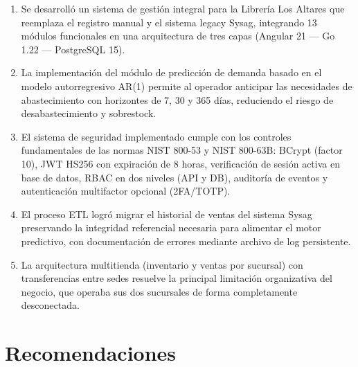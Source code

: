 \documentclass[12pt,a4paper,oneside]{report}
\begin{document}
\begin{enumerate}[leftmargin=1.5cm, label=\textbf{\arabic*.}]
  \item Se desarrolló un sistema de gestión integral para la Librería Los Altares que reemplaza el registro manual y el sistema legacy Sysag, integrando 13 módulos funcionales en una arquitectura de tres capas (Angular 21 — Go 1.22 — PostgreSQL 15).
  \item La implementación del módulo de predicción de demanda basado en el modelo autorregresivo AR(1) permite al operador anticipar las necesidades de abastecimiento con horizontes de 7, 30 y 365 días, reduciendo el riesgo de desabastecimiento y sobrestock.
  \item El sistema de seguridad implementado cumple con los controles fundamentales de las normas NIST 800-53 y NIST 800-63B: BCrypt (factor 10), JWT HS256 con expiración de 8 horas, verificación de sesión activa en base de datos, RBAC en dos niveles (API y DB), auditoría de eventos y autenticación multifactor opcional (2FA/TOTP).
  \item El proceso ETL logró migrar el historial de ventas del sistema Sysag preservando la integridad referencial necesaria para alimentar el motor predictivo, con documentación de errores mediante archivo de log persistente.
  \item La arquitectura multitienda (inventario y ventas por sucursal) con transferencias entre sedes resuelve la principal limitación organizativa del negocio, que operaba sus dos sucursales de forma completamente desconectada.
\end{enumerate}

\section{Recomendaciones}
\end{document}
